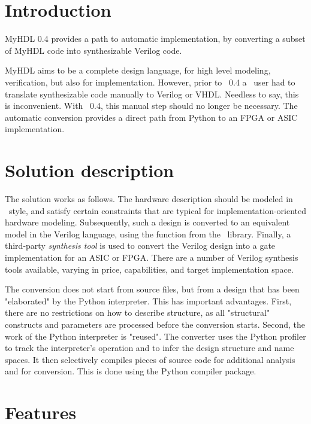 \section{Introduction\label{conv-intro}}

MyHDL 0.4 provides a path to automatic implementation, by converting
a subset of MyHDL code into synthesizable Verilog code.

MyHDL aims to be a complete design language, for high level modeling,
verification, but also for implementation. However, prior to \myhdl\
0.4 a \myhdl\ user had to translate synthesizable code manually to
Verilog or VHDL. Needless to say, this is inconvenient. With \myhdl\
0.4, this manual step should no longer be necessary.  The automatic
conversion provides a direct path from Python to an FPGA or ASIC
implementation.

\section{Solution description\label{conv-solution}}

The solution works as follows. The hardware description should be
modeled in \myhdl\ style, and satisfy certain constraints that are
typical for implementation-oriented hardware modeling.  Subsequently,
such a design is converted to an equivalent model in the Verilog
language, using the function \function{toVerilog} from the \myhdl\
library. Finally, a third-party \emph{synthesis tool} is used to
convert the Verilog design into a gate implementation for an ASIC or
FPGA. There are a number of Verilog synthesis tools available, varying
in price, capabilities, and target implementation space.

The conversion does not start from source files, but from a design
that has been "elaborated" by the Python interpreter.  This has
important advantages. First, there are no restrictions on how to
describe structure, as all "structural" constructs and parameters are
processed before the conversion starts. Second, the work of the Python
interpreter is "reused". The converter uses the Python profiler to
track the interpreter's operation and to infer the design structure
and name spaces. It then selectively compiles pieces of source code
for additional analysis and for conversion. This is done using the
Python compiler package.

\section{Features\label{conv-features}}

